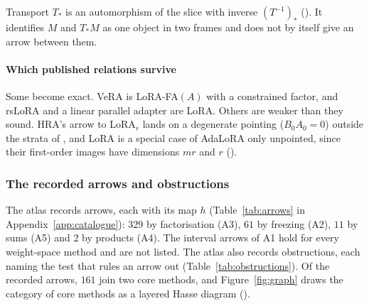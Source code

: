 Transport $T_*$ is an automorphism of the slice with inverse $(T^{-1})_*$ (). It identifies
$M$ and $T_*M$ as one object in two frames and does not by itself give an arrow between them.

\paragraph{Which published relations survive}
Some become exact. VeRA is LoRA-FA$(A)$ with a constrained factor, and rsLoRA and a linear parallel adapter are LoRA.
Others are weaker than they sound. HRA's arrow to LoRA$_r$ lands on a degenerate pointing ($B_0A_0=0$) outside the strata
of , and LoRA is a special case of AdaLoRA only unpointed, since their first-order images have
dimensions $mr$ and $r$ ().

\subsubsection{The recorded arrows and obstructions}\label{sec:atlas-graph}

The atlas records \nArrows{} arrows, each with its map $h$ (Table~\ref{tab:arrows} in Appendix~\ref{app:catalogue}):
$329$ by factorisation (A3), $61$ by freezing (A2), $11$ by sums (A5) and $2$ by products (A4). The interval arrows of
A1 hold for every weight-space method and are not listed. The atlas also records \nObstructions{} obstructions, each
naming the test that rules an arrow out (Table~\ref{tab:obstructions}). Of the recorded arrows, $161$ join two core
methods, and Figure~\ref{fig:graph} draws the category of core methods as a layered Hasse diagram ().

\begin{table}[t]
\centering\footnotesize
\caption{The \nObstructions{} recorded obstructions $M\not\to N$, by the test that rules the arrow out. The full list,
with the failing invariant of each, is the ancillary file \texttt{obstructions.csv}.}\label{tab:obstructions}

\end{table}

